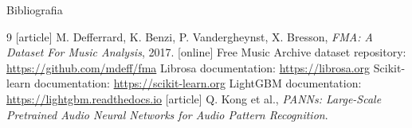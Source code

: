 \documentclass[aspectratio=1610,polish]{beamer}
\begin{document}
\begin{frame}{Bibliografia}
	\begin{thebibliography}{9}
		[article]
		 M. Defferrard, K. Benzi, P. Vandergheynst, X. Bresson, \textit{FMA: A Dataset For Music Analysis}, 2017.
		[online]
		 Free Music Archive dataset repository: \url{https://github.com/mdeff/fma}
		 Librosa documentation: \url{https://librosa.org}
		 Scikit-learn documentation: \url{https://scikit-learn.org}
		 LightGBM documentation: \url{https://lightgbm.readthedocs.io}
		[article]
		 Q. Kong et al., \textit{PANNs: Large-Scale Pretrained Audio Neural Networks for Audio Pattern Recognition}.
	\end{thebibliography}
\end{frame}
\end{document}

